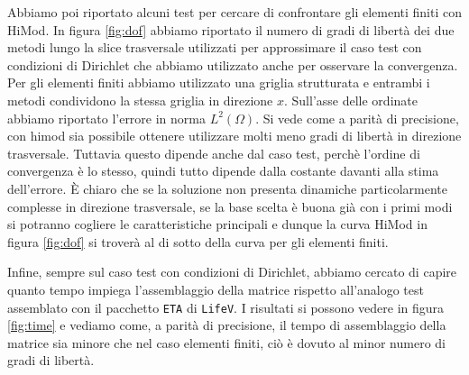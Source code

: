 Abbiamo poi riportato alcuni test per cercare di confrontare gli elementi finiti con HiMod.
In figura \ref{fig:dof} abbiamo riportato il numero di gradi di libert\`a dei due metodi lungo la slice trasversale utilizzati per 
approssimare il caso test con condizioni di Dirichlet che abbiamo utilizzato anche per osservare la convergenza.
Per gli elementi finiti abbiamo utilizzato una griglia strutturata e entrambi i metodi condividono la stessa griglia 
in direzione $x$. Sull'asse delle ordinate abbiamo riportato l'errore in norma $L^2(\Omega)$.
Si vede come a parit\`a di precisione, con himod sia possibile ottenere utilizzare molti meno gradi di libert\`a in direzione trasversale.
Tuttavia questo dipende anche dal caso test, perch\`e l'ordine di convergenza \`e lo stesso, quindi tutto dipende dalla 
costante davanti alla stima dell'errore. \`E chiaro che se la soluzione non presenta dinamiche particolarmente complesse in direzione trasversale,
se la base scelta \`e buona gi\`a con i primi modi si potranno cogliere le caratteristiche principali e dunque la curva HiMod
in figura \ref{fig:dof} si trover\`a al di sotto della curva per gli elementi finiti.

Infine, sempre sul caso test con condizioni di Dirichlet, abbiamo cercato di capire quanto tempo impiega l'assemblaggio della matrice
rispetto all'analogo test assemblato con il pacchetto \texttt{ETA} di \texttt{LifeV}.
I risultati si possono vedere in figura \ref{fig:time} e vediamo come, a parit\`a di precisione, il tempo di assemblaggio 
della matrice sia minore che nel caso elementi finiti, ci\`o \`e dovuto al minor numero di gradi di libert\`a.

